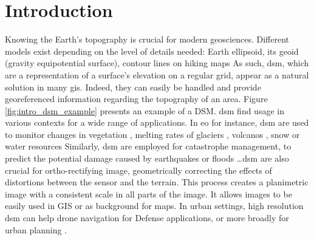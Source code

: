 \chapter*{Introduction}
Knowing the Earth's topography is crucial for modern geosciences. Different models exist depending on the level of details needed: Earth ellipsoid, its geoid (gravity equipotential surface), contour lines on hiking maps \etc As such, \acrfull{dsm}, which are a representation of a surface's elevation on a regular grid, appear as a natural solution in many \acrfull{gis}. Indeed, they can easily be handled and provide georeferenced information regarding the topography of an area. Figure \ref{fig:intro_dsm_example} presents an example of a DSM. \acrshort{dsm} find usage in various contexts for a wide range of applications. In \acrfull{eo} for instance, \acrshort{dsm} are used to monitor changes in vegetation \cite{sadeghi_canopy_2016}, melting rates of glaciers \cite{berthier_glacier_2014, rieg_pleiades_2018}, volcanos \cite{ganci_data_2022}, snow or water resources \cite{marti_mapping_2016, yamazaki_merit_2019} \etc Similarly, \acrshort{dsm} are employed for catastrophe management, to predict the potential damage caused by earthquakes or floods \cite{jenkins_physics-based_2023} \dots \acrshort{dsm} are also crucial for ortho-rectifying image, \ie geometrically correcting the effects of distortions between the sensor and the terrain. This process creates a planimetric image with a consistent scale in all parts of the image. It allows images to be easily used in GIS or as background for maps. In urban settings, high resolution \acrshort{dsm} can help drone navigation for Defense applications, or more broadly for urban planning \cite{velazco_3d_2012}.

